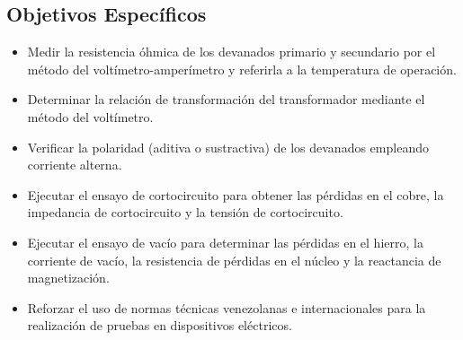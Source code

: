 \subsection*{Objetivos Específicos}
\begin{itemize}
    \item Medir la resistencia óhmica de los devanados primario y secundario por el método del voltímetro-amperímetro y referirla a la temperatura de operación.
    \item Determinar la relación de transformación del transformador mediante el método del voltímetro.
    \item Verificar la polaridad (aditiva o sustractiva) de los devanados empleando corriente alterna.
    \item Ejecutar el ensayo de cortocircuito para obtener las pérdidas en el cobre, la impedancia de cortocircuito y la tensión de cortocircuito.
    \item Ejecutar el ensayo de vacío para determinar las pérdidas en el hierro, la corriente de vacío, la resistencia de pérdidas en el núcleo y la reactancia de magnetización.
    \item Reforzar el uso de normas técnicas venezolanas e internacionales para la realización de pruebas en dispositivos eléctricos.
\end{itemize}

\newpage
